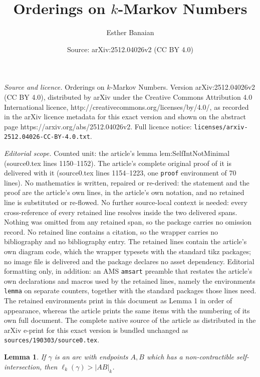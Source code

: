 \documentclass[10pt,a4paper]{amsart}
\title{Orderings on $k$-Markov Numbers}
\author{Esther Banaian}
\date{Source: arXiv:2512.04026v2 (CC BY 4.0)}
\newtheorem{lemma}{Lemma}
\begin{document}
\maketitle

\noindent\emph{Source and licence.} Orderings on $k$-Markov Numbers. Version arXiv:2512.04026v2 (CC BY 4.0), distributed by arXiv under the Creative Commons Attribution 4.0 International licence, http://creativecommons.org/licenses/by/4.0/, as recorded in the arXiv licence metadata for this exact version and shown on the abstract page https://arxiv.org/abs/2512.04026v2. Full licence notice: \texttt{licenses/arxiv-2512.04026-CC-BY-4.0.txt}.\par\smallskip

\noindent\textit{Editorial scope.} Counted unit: the article's lemma lem:SelfIntNotMinimal (source0.tex lines 1150--1152). The article's complete original proof of it is delivered with it (source0.tex lines 1154--1223, one \texttt{proof} environment of 70 lines). No mathematics is written, repaired or re-derived: the statement and the proof are the article's own lines, in the article's own notation, and no retained line is substituted or re-flowed.  No further source-local context is needed: every cross-reference of every retained line resolves inside the two delivered spans.  Nothing was omitted from any retained span, so the package carries no omission record.  No retained line contains a citation, so the wrapper carries no bibliography and no bibliography entry.  The retained lines contain the article's own diagram code, which the wrapper typesets with the standard tikz packages; no image file is delivered and the package declares no asset dependency.  Editorial formatting only, in addition: an AMS \texttt{amsart} preamble that restates the article's own declarations and macros used by the retained lines, namely the environments \texttt{lemma} on separate counters, together with the standard packages those lines need.  The retained environments print in this document as Lemma 1 in order of appearance, whereas the article prints the same items with the numbering of its own full document.  The complete native source of the article as distributed in the arXiv e-print for this exact version is bundled unchanged as \texttt{sources/190303/source0.tex}.
\begin{lemma}\label{lem:SelfIntNotMinimal}
If $\gamma$ is an arc with endpoints $A,B$ which has a non-contractible self-intersection, then $\ell_k(\gamma) > \vert AB \vert_k$.
\end{lemma}
\end{document}
